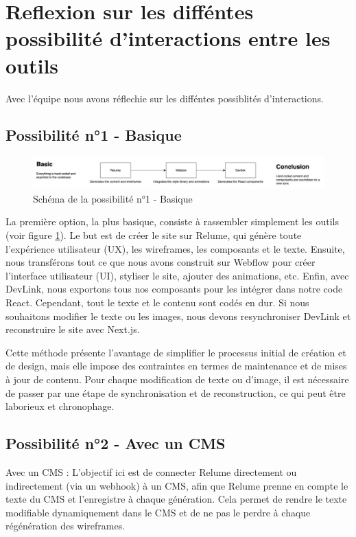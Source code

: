 \section{Reflexion sur les difféntes possibilité d'interactions entre les outils}
Avec l'équipe nous avons réflechie sur les difféntes possiblités d'interactions.

\subsection{Possibilité n°1 - Basique}
\begin{figure}[h] 
  \centering
  \includegraphics[width=1\textwidth]{Includes/Images/connection1.png}
  \caption{Schéma de la possibilité n°1 - Basique}
  \label{fig: Schéma de la possibilité n°1 - Basique}
\end{figure} 
La première option, la plus basique, consiste à rassembler simplement les outils (voir figure \ref{fig: Schéma de la possibilité n°1 - Basique}). Le but est de créer le site sur Relume, qui génère toute l'expérience utilisateur (UX), les wireframes, les composants et le texte. Ensuite, nous transférons tout ce que nous avons construit sur Webflow pour créer l'interface utilisateur (UI), styliser le site, ajouter des animations, etc. Enfin, avec DevLink, nous exportons tous nos composants pour les intégrer dans notre code React. Cependant, tout le texte et le contenu sont codés en dur. Si nous souhaitons modifier le texte ou les images, nous devons resynchroniser DevLink et reconstruire le site avec Next.js.

Cette méthode présente l'avantage de simplifier le processus initial de création et de design, mais elle impose des contraintes en termes de maintenance et de mises à jour de contenu. Pour chaque modification de texte ou d'image, il est nécessaire de passer par une étape de synchronisation et de reconstruction, ce qui peut être laborieux et chronophage.

\subsection{Possibilité n°2 - Avec un CMS}

Avec un CMS : L'objectif ici est de connecter Relume directement ou indirectement (via un webhook) à un CMS, afin que Relume prenne en compte le texte du CMS et l'enregistre à chaque génération. Cela permet de rendre le texte modifiable dynamiquement dans le CMS et de ne pas le perdre à chaque régénération des wireframes.

